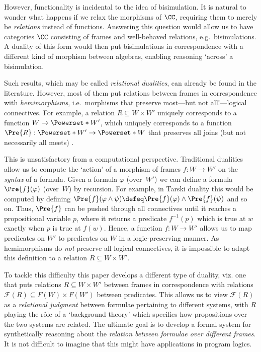 \documentclass[a4paper,UKenglish,cleveref, autoref]{lipics-v2021}
\begin{document}
However, functionality is incidental to the idea of bisimulation. It is natural
to wonder what happens if we relax the morphisms of $\CC$, requiring them to
merely be \emph{relations} instead of functions. Answering this question would
allow us to have categories $\CC$ consisting of frames and well-behaved
relations, e.g.\ bisimulations. A duality of this form would then put
bisimulations in correspondence with a different kind of morphism between
algebras, enabling reasoning `across' a bisimulation.

Such results, which may be called \emph{relational dualities}, can already be found
in the literature. However, most of them put relations between frames in
correspondence with \emph{hemimorphisms}, i.e.\ morphisms that preserve
most---but not all!---logical connectives. For example, a relation $R \subseteq
W \times W'$ uniquely corresponds to a function $W \to \Powerset*{W'}$, which uniquely
corresponds to a function $\Pre{R} : \Powerset*{W'} \to \Powerset*{W}$ that
preserves all joins (but not necessarily all meets) \cite{jonsson_1951} \cite[\S
2.3]{kishida_2018}. 

This is unsatisfactory from a computational perspective. Traditional dualities
allow us to compute the `action' of a morphism of frames $f : W \to W'$ on the
\emph{syntax} of a formula. Given a formula $\varphi$ (over~$W'$) we can define
a formula $\Pre{f}(\varphi)$ (over~$W$) by recursion. For example, in Tarski
duality this would be computed by defining $\Pre{f}(\varphi \land \psi) \defeq
\Pre{f}(\varphi) \land \Pre{f}(\psi)$ and so on. Thus, $\Pre{f}$ can be pushed
through all connectives until it reaches a propositional variable $p$, where it
returns a predicate $f^{-1}(p)$ which is true at $w$ exactly when $p$ is true at
$f(w)$. Hence, a function $f : W \to W'$ allows us to map predicates on $W'$ to
predicates on $W$ in a logic-preserving manner. As hemimorphisms do \emph{not}
preserve all logical connectives, it is impossible to adapt this definition to a
relation $R \subseteq W \times W'$.

To tackle this difficulty this paper develops a different type of duality, viz.
one that puts relations $R \subseteq W \times W'$ between frames in
correspondence with relations $\mathcal{F}(R) \subseteq F(W) \times F(W')$
between predicates. This allows us to view $\mathcal{F}(R)$ as a
\emph{relational judgment} between formulae pertaining to different systems,
with $R$ playing the r\^{o}le of a `background theory' which specifies how
propositions over the two systems are related. The ultimate goal is to develop a
formal system for synthetically reasoning about the \emph{relation between
formulae over different frames}. It is not difficult to imagine that this might
have applications in program logics.
\end{document}
